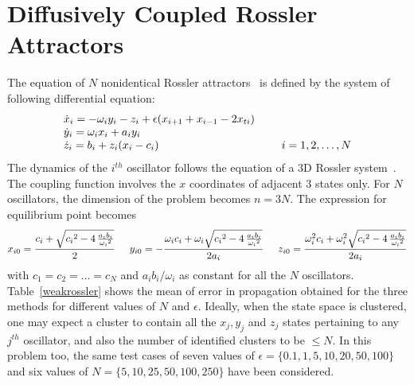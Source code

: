 \section{Diffusively Coupled Rossler Attractors}
The equation of $N$ nonidentical Rossler attractors~\cite{rossler1976equation,heagy1994synchronous} is defined by the system of following differential equation: 
\begin{equation}
\begin{array}{lc}
\dot{x}_{i} = -\omega_i y_{i} - z_{i} + \epsilon (x_{i+1} + x_{i-1} - 2x_{ti})  \\
\dot{y}_{i} = \omega_i x_{i} + a_i y_{i} \\
\dot{z}_{i} = b_i + z_{i}(x_{i} - c_i) & \hspace{5 mm}
i = 1,2,\ldots,N
\end{array}
\end{equation}
The dynamics of the $i^{th}$ oscillator follows the equation of a 3D Rossler system~\cite{rossler1976equation}. The coupling function involves the $x$ coordinates of adjacent 3 states only. For $N$ oscillators, the dimension of the problem becomes $n = 3N$. The expression for equilibrium point becomes
\begin{equation}
x_{i0} = \frac{c_i+\sqrt {{c_{{i}}}^{2}-4\,{\frac {a_{{i}}b_{{i}}}{{\omega_{{i}
}}^{2}}}}}{2} \hspace{5 mm}
y_{i0} = -\frac{\omega_i c_i+\omega_i\sqrt {{c_{{i}}}^{2}-4\,{\frac {a_{{i}}b_{{i}}}{{\omega_{{i}
}}^{2}}}}}{2a_i} \hspace{5 mm}
z_{i0} = \frac{\omega_i^2 c_i+\omega_i^2\sqrt {{c_{{i}}}^{2}-4\,{\frac {a_{{i}}b_{{i}}}{{\omega_{{i}
}}^{2}}}}}{2a_i}
\end{equation}
with $c_1 = c_2 = \ldots = c_N$ and $a_ib_i/\omega_i$ as constant for all the $N$ oscillators. Table~\ref{weakrossler} shows the mean of error in propagation obtained for the three methods for different values of $N$ and $\epsilon$. Ideally, when the state space is clustered, one may expect a cluster to contain all the $x_j,y_j$ and $z_j$ states pertaining to any $j^{th}$ oscillator, and also the number of identified clusters to be $\le N$.  In this problem too, the same test cases of seven values of $\epsilon = \lbrace 0.1, 1, 5, 10, 20, 50, 100 \rbrace$ and six values of $N =  \lbrace 5, 10, 25, 50, 100, 250  \rbrace $ have been considered.


